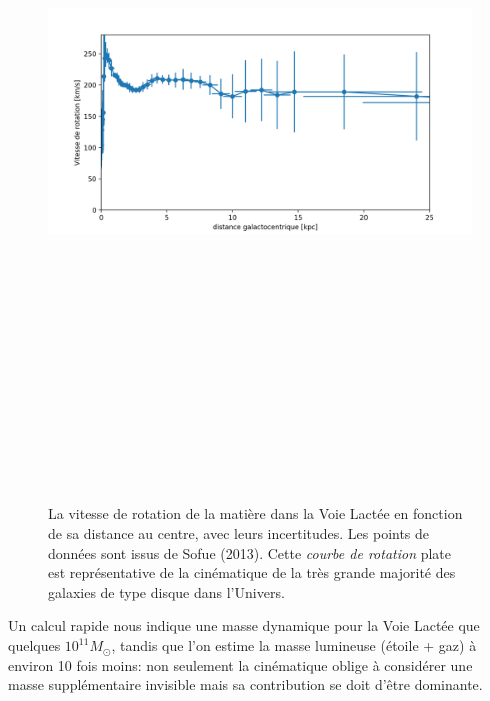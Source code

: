 \begin{figure}[htbp]
	\centering
		\includegraphics[height=20cm]{figs/rocurveMW.png}
	\caption[La vitesse de rotation de la matière dans la Voie Lactée]{La vitesse de rotation de la matière dans la Voie Lactée en fonction de sa distance au centre, avec leurs incertitudes. Les points de données sont issus de Sofue (2013). Cette \textit{courbe de rotation} plate est représentative de la cinématique de la très grande majorité des galaxies de type disque dans l'Univers.} 
	\label{f:rotcurve}
\end{figure}

Un calcul rapide nous indique une masse dynamique pour la Voie Lactée que quelques $10^{11} M_\odot$, tandis que l'on estime la masse lumineuse (étoile + gaz) à environ 10 fois moins: non seulement la cinématique oblige à considérer une masse supplémentaire invisible mais sa contribution se doit d'être dominante.

